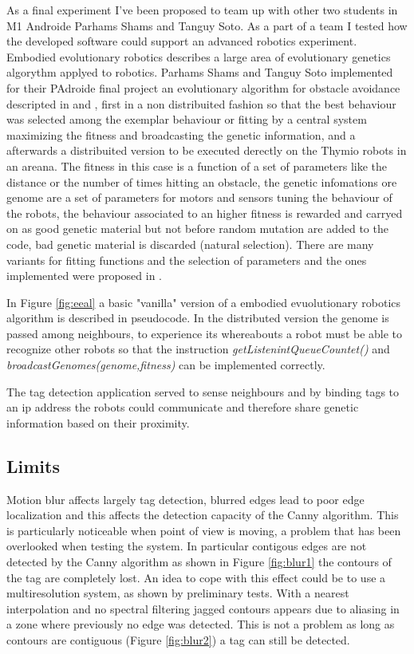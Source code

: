 \documentclass[a4paper]{report}
\begin{document}
As a final experiment I've been proposed to team up with other two students in M1 Androide Parhams Shams and Tanguy Soto. As a part of a team I tested how the developed software could support an advanced robotics experiment.
Embodied evolutionary robotics describes a large area of evolutionary genetics algorythm applyed to robotics. Parhams Shams and Tanguy Soto implemented for their PAdroide final project an evolutionary algorithm for obstacle avoidance descripted in \cite{Rob1} and \cite{Rob2}, first in a non distribuited fashion so that the best behaviour was selected among the exemplar behaviour or fitting by a central system maximizing the fitness and broadcasting the genetic information, and a afterwards a distribuited version to be executed derectly on the Thymio robots in an areana. The fitness in this case is a function of a set of parameters like the distance or the number of times hitting an obstacle, the genetic infomations ore genome are a set of parameters for motors and sensors tuning the behaviour of the robots, the behaviour associated to an higher fitness is rewarded and carryed on as good genetic material but not before random mutation are added to the code, bad genetic material is discarded (natural selection). There are many variants for fitting functions and the selection of parameters and the ones implemented were proposed in \cite{Rob2}.

In Figure \ref{fig:eeal}\cite{Rob1} a basic "vanilla" version of a  embodied evuolutionary robotics algorithm is described in pseudocode. In the distributed version the genome is passed among neighbours, to experience its whereabouts a robot must be able to recognize other robots so that the instruction \textit{getListenintQueueCountet()} and \textit{broadcastGenomes(genome,fitness)} can be implemented correctly. 

The tag detection application served to sense neighbours and by binding tags to an ip address the robots could communicate and therefore share genetic information based on their proximity.

\subsection{Limits}

Motion blur affects largely tag detection, blurred edges lead to poor edge localization and this affects the detection capacity of the Canny algorithm. This is particularly noticeable when point of view is moving, a problem that has been overlooked when testing the system. In particular contigous edges are not detected by the Canny algorithm as shown in Figure \ref{fig:blur1} the contours of the tag are completely lost. An idea to cope with this effect could be to use a multiresolution system, as shown by preliminary tests. With a nearest interpolation and no spectral filtering jagged contours appears due to aliasing in a zone where previously no edge was detected. This is not a problem as long as contours are contiguous (Figure \ref{fig:blur2}) a tag can still be detected.
\end{document}
